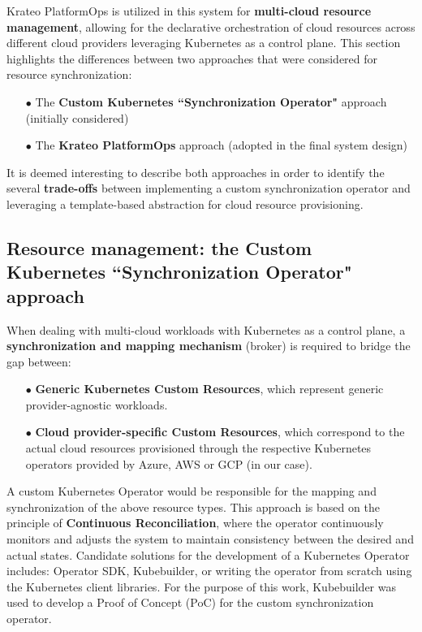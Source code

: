 Krateo PlatformOps is utilized in this system for \textbf{multi-cloud resource management}, allowing for the declarative orchestration of cloud resources across different cloud providers leveraging Kubernetes as a control plane. 
This section highlights the differences between two approaches that were considered for resource synchronization:
\begin{itemize}[itemsep=0.2pt, topsep=1pt]
  \item[$\bullet$] The \textbf{Custom Kubernetes ``Synchronization Operator"} approach (initially considered)
  \item[$\bullet$] The \textbf{Krateo PlatformOps} approach (adopted in the final system design) \\
\end{itemize}

It is deemed interesting to describe both approaches in order to identify the several \textbf{trade-offs} between implementing a custom synchronization operator and leveraging a template-based abstraction for cloud resource provisioning.

\subsection{Resource management: the Custom Kubernetes ``Synchronization Operator" approach}

When dealing with multi-cloud workloads with Kubernetes as a control plane, a \textbf{synchronization and mapping mechanism} (broker) is required to bridge the gap between:
\begin{itemize}[itemsep=0.2pt, topsep=1pt]
  \item[$\bullet$] \textbf{Generic Kubernetes Custom Resources}, which represent generic provider-agnostic workloads.
  \item[$\bullet$] \textbf{Cloud provider-specific Custom Resources}, which correspond to the actual cloud resources provisioned through the respective Kubernetes operators provided by Azure, AWS or GCP (in our case).
\end{itemize}

A custom Kubernetes Operator would be responsible for the mapping and synchronization of the above resource types. This approach is based on the principle of \textbf{Continuous Reconciliation}, where the operator continuously monitors and adjusts the system to maintain consistency between the desired and actual states.
Candidate solutions for the development of a Kubernetes Operator includes: Operator SDK, Kubebuilder, or writing the operator from scratch using the Kubernetes client libraries. 
For the purpose of this work, Kubebuilder was used to develop a Proof of Concept (PoC) for the custom synchronization operator.


